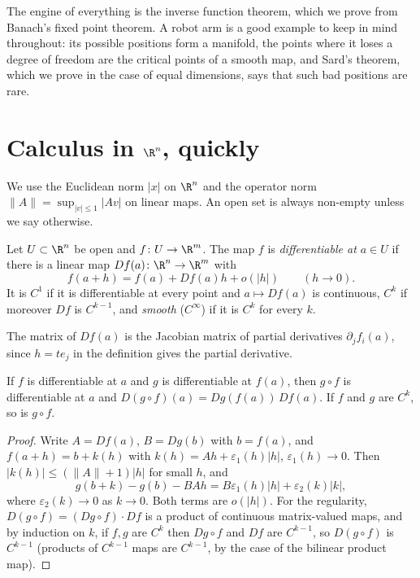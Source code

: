 The engine of everything is the inverse function theorem, which we prove from Banach's fixed point theorem. A robot arm is a good example to keep in
mind throughout: its possible positions form a manifold, the points where it loses a degree of freedom are the critical points of a smooth map, and
Sard's theorem, which we prove in the case of equal dimensions, says that such bad positions are rare.

\section{Calculus in \texorpdfstring{$\R^n$}{R\^{}n}, quickly}

We use the Euclidean norm $|x|$ on $\R^n$ and the operator norm $\|A\|=\sup_{|v|\le1}|Av|$ on linear maps. An open set is always non-empty unless we say
otherwise.

\begin{definition}
Let $U\subset\R^n$ be open and $f\colon U\to\R^m$. The map $f$ is \emph{differentiable at $a\in U$} if there is a linear map $Df(a)\colon\R^n\to\R^m$
with
\[
f(a+h)=f(a)+Df(a)h+o(|h|)\qquad(h\to0).
\]
It is \emph{$C^1$} if it is differentiable at every point and $a\mapsto Df(a)$ is continuous, $C^k$ if moreover $Df$ is $C^{k-1}$, and \emph{smooth}
($C^\infty$) if it is $C^k$ for every $k$.
\end{definition}

The matrix of $Df(a)$ is the Jacobian matrix of partial derivatives $\partial_jf_i(a)$, since $h=te_j$ in the definition gives the partial derivative.

\begin{proposition}\label{prop:chain}
If $f$ is differentiable at $a$ and $g$ is differentiable at $f(a)$, then $g\circ f$ is differentiable at $a$ and $D(g\circ f)(a)=Dg(f(a))\,Df(a)$. If
$f$ and $g$ are $C^k$, so is $g\circ f$.
\end{proposition}
\begin{proof}
Write $A=Df(a)$, $B=Dg(b)$ with $b=f(a)$, and $f(a+h)=b+k(h)$ with $k(h)=Ah+\varepsilon_1(h)|h|$, $\varepsilon_1(h)\to0$. Then $|k(h)|\le(\|A\|+1)|h|$ for small
$h$, and
\[
g(b+k)-g(b)-BAh=B\varepsilon_1(h)|h|+\varepsilon_2(k)|k|,
\]
where $\varepsilon_2(k)\to0$ as $k\to0$. Both terms are $o(|h|)$. For the regularity, $D(g\circ f)=(Dg\circ f)\cdot Df$ is a product of continuous
matrix-valued maps, and by induction on $k$, if $f,g$ are $C^k$ then $Dg\circ f$ and $Df$ are $C^{k-1}$, so $D(g\circ f)$ is $C^{k-1}$ (products of
$C^{k-1}$ maps are $C^{k-1}$, by the case of the bilinear product map).
\end{proof}

